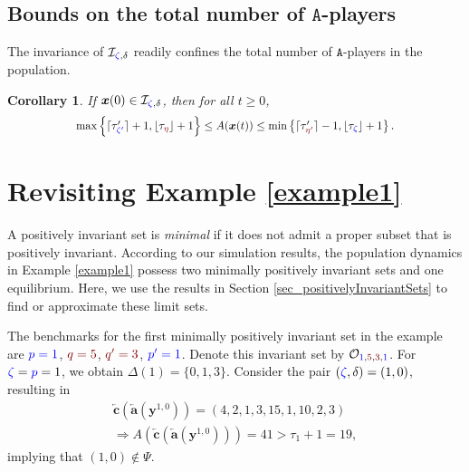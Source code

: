 \documentclass[10 pt,twocolumn,journal]{IEEEtran}
\DeclarePairedDelimiter{\ceil}{\lceil}{\rceil}
\DeclarePairedDelimiter{\floor}{\lfloor}{\rfloor}
\theoremstyle{plain}
\newtheorem{corollary}{Corollary}
\newcommand{\A}{\mathcal{A}}
\newcommand{\I}{\mathcal{I}}
\newcommand{\x}{\bm{x}}
\newcommand{\y}{\bm{y}}
\renewcommand{\a}{\bm{a}}
\renewcommand{\c}{\bm{c}}
\newcommand{\p}{\tb{p}}
\newcommand{\pp}{\tb{p'}}
\newcommand{\q}{\tr{q}}
\newcommand{\qq}{\tr{q'}}
\renewcommand{\r}{\tb{\zeta}}
\newcommand{\rr}{\tb{\zeta'}}
\newcommand{\s}{\tr{\eta}}
\renewcommand{\ss}{\tr{\eta'}}
\renewcommand{\d}{{\delta}}
\renewcommand{\A}{\mathtt{A}}
\newcommand{\tb}{\textcolor{blue}}
\newcommand{\tr}{\textcolor{Myred}}
\theoremstyle{definition}
\begin{document}
\subsection{Bounds on the total number of $\A$-players}
The invariance of $\I_{\r,\d}$ readily confines the total number of $\A$-players in the population. 
%
\begin{corollary}   \label{cor_exremumNumberOfAPlayers}
    If $\x(0)\in\I_{\r,\d}$, then for all $t\geq 0$,
    \begin{equation*}\scalebox{.89}{\text{$
        \max\left\{\ceil{\tau'_{\rr}}+1, \floor{\tau_{\s}}+1\right\} 
        \leq A(\x(t)) \leq 
        \min\left\{\ceil{\tau'_{\ss}}-1, \floor{\tau_{\r}}+1\right\}. $}}
    \end{equation*}
\end{corollary}
\section{Revisiting Example \ref{example1}} \label{sec_revisiting} 
A positively invariant set is \emph{minimal} if it does not admit a proper subset that is positively invariant. 
According to our simulation results, the population dynamics in Example \ref{example1} possess two minimally positively invariant sets and one equilibrium. 
Here, we use the results in Section \ref{sec_positivelyInvariantSets} to find or approximate these limit sets. 

The benchmarks for the first minimally positively invariant set in the example are 
$\tb{\p = 1}$, $\tr{\q = 5}$, $\tr{\qq = 3}$, $\tb{\pp = 1}$.
Denote this invariant set by $\mathcal{O}_{\tb{1}, \tr{5}, \tr{3}, \tb{1}}$.
For $\r=\p=1$, we obtain $\Delta(1)=\{0,1,3\}$.
Consider the pair $(\r, \d) = (1,0)$, resulting in  
\begin{gather*}
    \overleftarrow{\c}(\overleftarrow{\a}(\y^{1,0})) 
    = (4,2,1,3,15,1,10,2,3)    \\
    \Rightarrow
     A(\overleftarrow{\c}(\overleftarrow{\a}(\y^{1,0}))) = 41 > {\tau_1} + 1 = 19,
\end{gather*}
implying that $(1,0)\not\in\Psi$.
\end{document}

